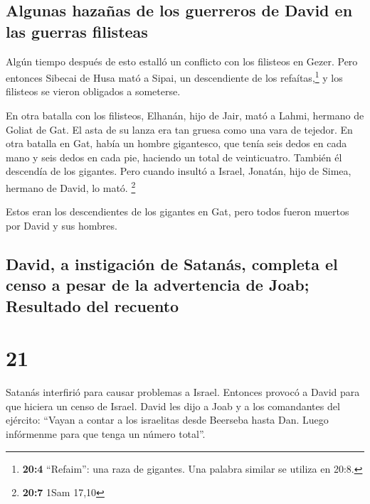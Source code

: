 \hypertarget{algunas-hazauxf1as-de-los-guerreros-de-david-en-las-guerras-filisteas}{%
\subsection{Algunas hazañas de los guerreros de David en las guerras
filisteas}\label{algunas-hazauxf1as-de-los-guerreros-de-david-en-las-guerras-filisteas}}

 Algún tiempo después de esto estalló un conflicto con los
filisteos en Gezer. Pero entonces Sibecai de Husa mató a Sipai, un
descendiente de los refaítas,\footnote{\textbf{20:4} ``Refaim'': una
  raza de gigantes. Una palabra similar se utiliza en 20:8.} y los
filisteos se vieron obligados a someterse.

 En otra batalla con los filisteos, Elhanán, hijo de Jair,
mató a Lahmi, hermano de Goliat de Gat. El asta de su lanza era tan
gruesa como una vara de tejedor.  En otra batalla en Gat,
había un hombre gigantesco, que tenía seis dedos en cada mano y seis
dedos en cada pie, haciendo un total de veinticuatro. También él
descendía de los gigantes.  Pero cuando insultó a Israel,
Jonatán, hijo de Simea, hermano de David, lo mató. \footnote{\textbf{20:7}
  1Sam 17,10}

 Estos eran los descendientes de los gigantes en Gat, pero
todos fueron muertos por David y sus hombres.

\hypertarget{david-a-instigaciuxf3n-de-satanuxe1s-completa-el-censo-a-pesar-de-la-advertencia-de-joab-resultado-del-recuento}{%
\subsection{David, a instigación de Satanás, completa el censo a pesar
de la advertencia de Joab; Resultado del
recuento}\label{david-a-instigaciuxf3n-de-satanuxe1s-completa-el-censo-a-pesar-de-la-advertencia-de-joab-resultado-del-recuento}}

\hypertarget{section-20}{%
\section{21}\label{section-20}}

 Satanás interfirió para causar problemas a Israel.
Entonces provocó a David para que hiciera un censo de Israel.
 David les dijo a Joab y a los comandantes del ejército:
``Vayan a contar a los israelitas desde Beerseba hasta Dan. Luego
infórmenme para que tenga un número total''.

